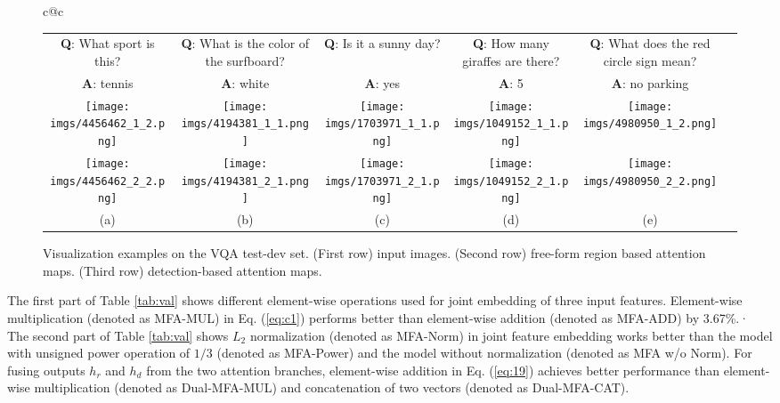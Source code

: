 \documentclass[letterpaper]{article}
\begin{document}
{\begin{figure*}[t!]
\begin{tabular}{c@{\hspace{-2.5mm}}c}
\begin{tabular}{c@{\hspace{2mm}}c@{\hspace{2mm}}c@{\hspace{2mm}}c@{\hspace{2mm}}c@{\hspace{2mm}}c}
			\textbf{Q}: {What sport is this?} & 
			\textbf{Q}: {What is the color of the surfboard?} & 
			\textbf{Q}: {Is it a sunny day?} & 
			\textbf{Q}: {How many giraffes are there?} &
\textbf{Q}: {What does the red circle sign mean?} \\
			\vspace{0.01in}
			\textbf{A}: {\color{ForestGreen} tennis} & 
			\textbf{A}: {\color{ForestGreen} white} & 
			\textbf{A}: {\color{ForestGreen} yes} & 
			\textbf{A}: {\color{ForestGreen} 5} &
			\textbf{A}: {\color{red} no parking} \\ 
			
			\texttt{[image: imgs/4456462\_1\_2.png]}&
			\texttt{[image: imgs/4194381\_1\_1.png]}&
			\texttt{[image: imgs/1703971\_1\_1.png]}&
			\texttt{[image: imgs/1049152\_1\_1.png]}&
			\texttt{[image: imgs/4980950\_1\_2.png]}\\	
			
			\texttt{[image: imgs/4456462\_2\_2.png]}&
			\texttt{[image: imgs/4194381\_2\_1.png]}&
			\texttt{[image: imgs/1703971\_2\_1.png]}&
			\texttt{[image: imgs/1049152\_2\_1.png]}&
			\texttt{[image: imgs/4980950\_2\_2.png]}\\
			
			{\normalsize(a) } & {\normalsize(b) } & {\normalsize(c)} & {\normalsize(d) }  & {\normalsize(e) }
		\end{tabular}
	\end{tabular}
	\caption{Visualization examples on the VQA test-dev set. (First row) input images. (Second row) free-form region based attention maps. (Third row) detection-based attention maps.}
	\label{fig:vis}
\end{figure*}




The first part of Table \ref{tab:val} shows different element-wise operations used for joint embedding of three input features. Element-wise multiplication (denoted as MFA-MUL) in Eq. (\ref{eq:c1}) performs better than element-wise addition (denoted as MFA-ADD) by 3.67\%.· The second part of Table \ref{tab:val} shows $L_2$ normalization (denoted as MFA-Norm) in joint feature embedding works better than the model with unsigned power operation of $1/3$ (denoted as MFA-Power) and the model without normalization (denoted as MFA w/o Norm). For fusing outputs $h_r$ and $h_d$ from the two attention branches, element-wise addition in Eq. (\ref{eq:19}) achieves better performance than element-wise multiplication (denoted as Dual-MFA-MUL) and concatenation of two vectors (denoted as Dual-MFA-CAT).


}
\end{document}
